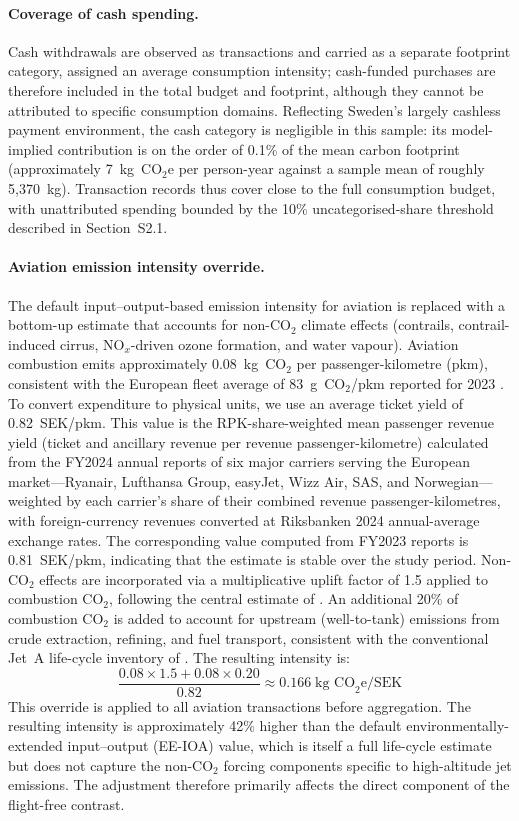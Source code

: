 \documentclass[12pt]{article}
\begin{document}
\paragraph{Coverage of cash spending.}
Cash withdrawals are observed as transactions and carried as a separate footprint category, assigned an average consumption intensity; cash-funded purchases are therefore included in the total budget and footprint, although they cannot be attributed to specific consumption domains. Reflecting Sweden's largely cashless payment environment, the cash category is negligible in this sample: its model-implied contribution is on the order of 0.1\% of the mean carbon footprint (approximately 7~kg~CO$_2$e per person-year against a sample mean of roughly 5,370~kg). Transaction records thus cover close to the full consumption budget, with unattributed spending bounded by the 10\% uncategorised-share threshold described in Section~S2.1.

\paragraph{Aviation emission intensity override.}
The default input--output-based emission intensity for aviation is replaced with a bottom-up estimate that accounts for non-CO$_2$ climate effects (contrails, contrail-induced cirrus, NO$_x$-driven ozone formation, and water vapour). Aviation combustion emits approximately 0.08~kg~CO$_2$ per passenger-kilometre (pkm), consistent with the European fleet average of 83~g~CO$_2$/pkm reported for 2023 \citep{easa2025}. To convert expenditure to physical units, we use an average ticket yield of 0.82~SEK/pkm. This value is the RPK-share-weighted mean passenger revenue yield (ticket and ancillary revenue per revenue passenger-kilometre) calculated from the FY2024 annual reports of six major carriers serving the European market---Ryanair, Lufthansa Group, easyJet, Wizz Air, SAS, and Norwegian---weighted by each carrier's share of their combined revenue passenger-kilometres, with foreign-currency revenues converted at Riksbanken 2024 annual-average exchange rates. The corresponding value computed from FY2023 reports is 0.81~SEK/pkm, indicating that the estimate is stable over the study period. Non-CO$_2$ effects are incorporated via a multiplicative uplift factor of 1.5 applied to combustion CO$_2$, following the central estimate of \citet{lee2021contribution}. An additional 20\% of combustion CO$_2$ is added to account for upstream (well-to-tank) emissions from crude extraction, refining, and fuel transport, consistent with the conventional Jet~A life-cycle inventory of \citet{stratton2010lifecycle}. The resulting intensity is:
\[
  \frac{0.08 \times 1.5 + 0.08 \times 0.20}{0.82} \approx 0.166 \;\text{kg CO}_2\text{e/SEK}
\]
This override is applied to all aviation transactions before aggregation. The resulting intensity is approximately 42\% higher than the default environmentally-extended input--output (EE-IOA) value, which is itself a full life-cycle estimate but does not capture the non-CO$_2$ forcing components specific to high-altitude jet emissions. The adjustment therefore primarily affects the direct component of the flight-free contrast.
\end{document}
